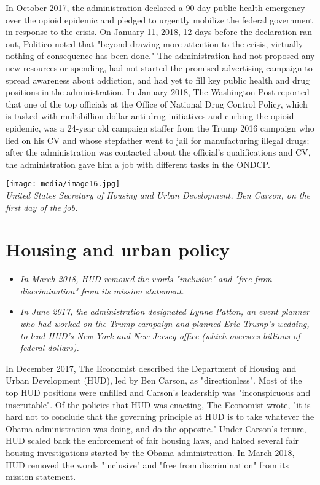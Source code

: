 In October 2017, the administration declared a 90-day public health
emergency over the opioid epidemic and pledged to urgently mobilize the
federal government in response to the crisis. On January 11, 2018, 12
days before the declaration ran out, Politico noted that "beyond drawing
more attention to the crisis, virtually nothing of consequence has been
done." The administration had not proposed any new resources or
spending, had not started the promised advertising campaign to spread
awareness about addiction, and had yet to fill key public health and
drug positions in the administration. In January 2018, The Washington
Post reported that one of the top officials at the Office of National
Drug Control Policy, which is tasked with multibillion-dollar anti-drug
initiatives and curbing the opioid epidemic, was a 24-year old campaign
staffer from the Trump 2016 campaign who lied on his CV and whose
stepfather went to jail for manufacturing illegal drugs; after the
administration was contacted about the official's qualifications and CV,
the administration gave him a job with different tasks in the ONDCP.

\texttt{[image: media/image16.jpg]}\\
\emph{United States Secretary of Housing and Urban Development, Ben
Carson, on the first day of the job.}

\section{Housing and urban policy}\label{housing-and-urban-policy}

\begin{itemize}
\item
  \emph{In March 2018, HUD removed the words "inclusive" and "free from
  discrimination" from its mission statement.}
\item
  \emph{In June 2017, the administration designated Lynne Patton, an
  event planner who had worked on the Trump campaign and planned Eric
  Trump's wedding, to lead HUD's New York and New Jersey office (which
  oversees billions of federal dollars).}
\end{itemize}

In December 2017, The Economist described the Department of Housing and
Urban Development (HUD), led by Ben Carson, as "directionless". Most of
the top HUD positions were unfilled and Carson's leadership was
"inconspicuous and inscrutable". Of the policies that HUD was enacting,
The Economist wrote, "it is hard not to conclude that the governing
principle at HUD is to take whatever the Obama administration was doing,
and do the opposite." Under Carson's tenure, HUD scaled back the
enforcement of fair housing laws, and halted several fair housing
investigations started by the Obama administration. In March 2018, HUD
removed the words "inclusive" and "free from discrimination" from its
mission statement.

